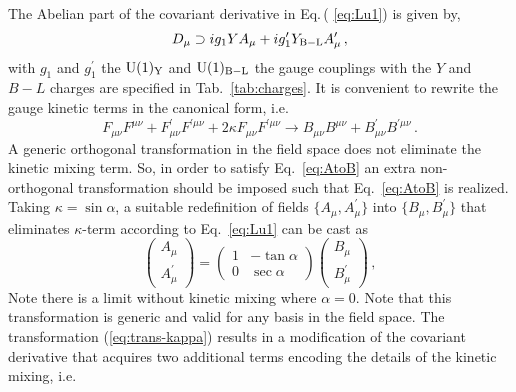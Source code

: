 The Abelian part of the covariant derivative in Eq.\,( \ref{eq:Lu1}) is given by,
\begin{equation}
	D_\mu \supset i g_1 Y A_\mu + i g_1^\prime Y_{\rm B-L} A_\mu^\prime\,,
\end{equation} 
% 
with $g_1$ and $g_1^\prime$ the $\mathrm{U}(1)_{\mathrm{Y}}$ and $\mathrm{U}(1)_{\mathrm{B-L}}$ the gauge couplings with the $Y$ and $B-L$ charges are specified in Tab.~\ref{tab:charges}. It is convenient to rewrite the gauge kinetic terms in the canonical form, i.e.
%
\begin{equation}
	F_{\mu \nu} F^{\mu \nu} + F^\prime_{\mu \nu} F^{\prime \mu \nu} + 2 \kappa F_{\mu \nu} F^{\prime \mu \nu} \to B_{\mu \nu} B^{\mu \nu} + B^\prime_{\mu \nu} B^{\prime \mu \nu}\,.
	\label{eq:AtoB}
\end{equation}
%
A generic orthogonal transformation in the field space does not eliminate the kinetic mixing term. So, in order to satisfy Eq.~\eqref{eq:AtoB} an extra non-orthogonal transformation should be imposed such that Eq.~\eqref{eq:AtoB} is realized. Taking $\kappa = \sin \alpha$, a suitable redefinition of fields $\{A_\mu,A_\mu^\prime\}$ into $\{B_\mu, B_\mu^\prime\}$ that eliminates $\kappa$-term according to Eq.~\eqref{eq:Lu1} can be cast as
\begin{equation}
	\begin{pmatrix}
	A_\mu \\
	A^\prime_\mu 
	\end{pmatrix}
	=
	\begin{pmatrix}
	1 & -\tan \alpha \\
	0 & \sec \alpha 
	\end{pmatrix}
	\begin{pmatrix}
	B_\mu \\
	B^\prime_\mu 
	\end{pmatrix}\,,
	\label{eq:trans-kappa}
\end{equation}
Note there is a limit without kinetic mixing where $\alpha = 0$. Note that this transformation is generic and valid for any basis in the field space. The transformation (\ref{eq:trans-kappa}) results in a modification of the covariant derivative that acquires two additional terms encoding the details of the kinetic mixing, i.e.

